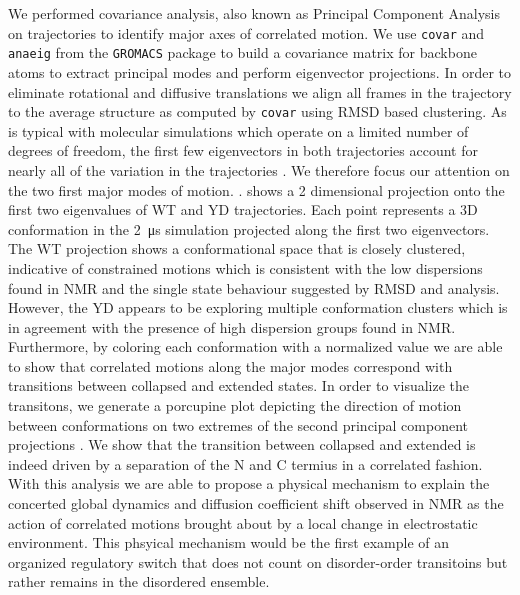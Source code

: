 We performed covariance analysis, also known as Principal Component Analysis on \gct trajectories to identify major axes of correlated motion. We use \texttt{covar} and \texttt{anaeig} from the \texttt{GROMACS} package to build a covariance matrix for backbone atoms to extract principal modes and perform eigenvector projections. In order to eliminate rotational and diffusive  translations we align all frames in the trajectory to the average structure as computed by \texttt{covar} using RMSD based clustering. As is typical with molecular simulations which operate on a limited number of degrees of freedom, the first few eigenvectors in both trajectories account for nearly all of the variation in the trajectories . We therefore focus our attention on the two first major modes of motion. .  shows a 2 dimensional projection onto the first two eigenvalues of WT and YD trajectories. Each point represents a 3D conformation in the \SI{2}{\us} simulation projected along the first two eigenvectors. The WT projection shows a conformational space that is closely clustered, indicative of constrained motions which is consistent with the low dispersions found in NMR and the single state behaviour suggested by RMSD and \diffusion analysis. However, the YD appears to be exploring  multiple conformation clusters which is in agreement with the presence of high dispersion groups found in NMR. Furthermore, by coloring each conformation with a normalized \diffusion value we are able to show that correlated motions along the major modes correspond with transitions between collapsed and extended states. In order to visualize the transitons, we generate a porcupine plot depicting the direction of motion between conformations on two extremes of the second principal component projections .  We show that the transition between collapsed and extended is indeed driven by a separation of the N and C termius in a correlated fashion.  With this analysis we are able to propose a physical mechanism to explain the concerted global dynamics and diffusion coefficient shift observed in NMR as the action of correlated motions brought about by a local change in electrostatic environment. This phsyical mechanism would be the first example of an organized regulatory switch that does not count on disorder-order transitoins but rather remains in the disordered ensemble. 






